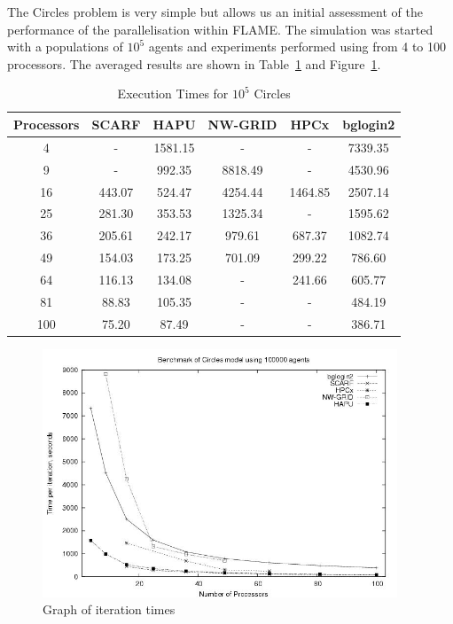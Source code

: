 The Circles problem is very simple but allows us an initial assessment of the performance of the parallelisation within FLAME. The simulation was started with a populations of $10^5$  agents and experiments performed using from 4 to 100 processors. The averaged results are shown in Table~\ref{tab:ExecutionTimesForCircles} and Figure~\ref{fig:Circles-graph}.
{
\renewcommand{\arraystretch}{1.25}
\begin{table}[ht]
 \centering
  \begin{tabular}{c|ccccc}
 Processors &SCARF  &HAPU  &NW-GRID &HPCx  &bglogin2 \\ \hline
 4   &-   &1581.15  & -   & -    &7339.35  \\
 9   &-   &992.35   &8818.49  &-   &4530.96  \\
 16   &443.07   &524.47   &4254.44  &1464.85  &2507.14  \\
 25   &281.30   &353.53   &1325.34  &-   &1595.62  \\
 36   &205.61   &242.17   &979.61   &687.37   &1082.74  \\
 49   &154.03   &173.25   &701.09   &299.22   &786.60   \\
 64   &116.13   &134.08   &-   &241.66   &605.77   \\
 81   &88.83   &105.35   &-   &-   &484.19   \\
 100   &75.20   &87.49   &-   &-   &386.71   \\
 \end{tabular}
 \caption{Execution Times for $10^5$ Circles}
 \label{tab:ExecutionTimesForCircles}
\end{table}
}
\begin{figure}[ht]
 \centering
  \includegraphics[width=300pt]{Circles-graph.jpg}
 \caption{Graph of iteration times}
 \label{fig:Circles-graph}
\end{figure}

